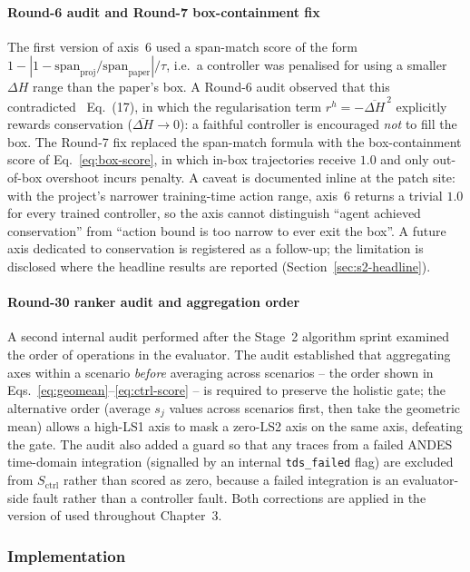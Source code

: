 \documentclass{unnc-fyp}
\begin{document}
\paragraph{Round-6 audit and Round-7 box-containment fix}
The first version of axis~6 used a span-match score of the form
$1 - |1 - \mathrm{span}_\mathrm{proj}/\mathrm{span}_\mathrm{paper}|/\tau$,
i.e.\ a controller was penalised for using a smaller $\Delta H$
range than the paper's box.
A Round-6 audit observed that this contradicted~\cite{yang2023ddic}
Eq.~(17), in which the regularisation term
$r^h = -\overline{\Delta H}^{\,2}$ explicitly rewards conservation
($\overline{\Delta H} \to 0$): a faithful controller is encouraged
\emph{not} to fill the box.
The Round-7 fix replaced the span-match formula with the
box-containment score of Eq.~\eqref{eq:box-score}, in which
in-box trajectories receive $1.0$ and only out-of-box overshoot
incurs penalty.
A caveat is documented inline at the patch site: with the
project's narrower training-time action range, axis~6 returns a
trivial $1.0$ for every trained controller, so the axis cannot
distinguish ``agent achieved conservation'' from ``action bound is
too narrow to ever exit the box''.
A future axis dedicated to conservation is registered as a
follow-up; the limitation is disclosed where the headline
results are reported (Section~\ref{sec:s2-headline}).

\paragraph{Round-30 ranker audit and aggregation order}
A second internal audit performed after the Stage~2 algorithm
sprint examined the order of operations in the evaluator.
The audit established that aggregating axes within a scenario
\emph{before} averaging across scenarios -- the order shown in
Eqs.~\eqref{eq:geomean}--\eqref{eq:ctrl-score} -- is required to
preserve the holistic gate; the alternative order (average
$s_j$ values across scenarios first, then take the geometric mean)
allows a high-LS1 axis to mask a zero-LS2 axis on the same axis,
defeating the gate.
The audit also added a guard so that any traces from a failed ANDES
time-domain integration (signalled by an internal
\verb|tds_failed| flag) are excluded from
$S_\mathrm{ctrl}$ rather than scored as zero, because a failed
integration is an evaluator-side fault rather than a controller
fault.
Both corrections are applied in the version of
 used throughout Chapter~3.

\subsubsection{Implementation}
\end{document}
